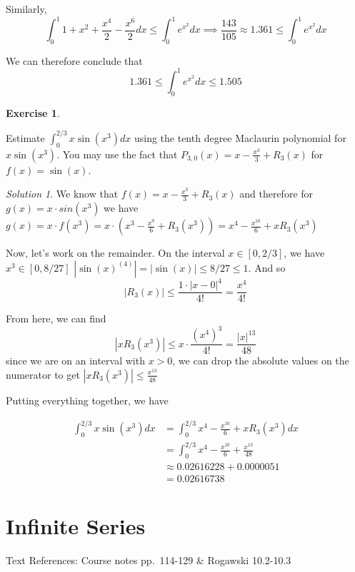 \documentclass[
]{book}
\theoremstyle{definition}
\theoremstyle{definition}
\theoremstyle{definition}
\newtheorem{exercise}{Exercise}[chapter]
\theoremstyle{definition}
\theoremstyle{remark}
\newtheorem*{solution}{Solution}
\begin{document}
Similarly, \[\int_0^1 1+x^2+\frac{x^4}{2}-\frac{x^6}{2}dx \leq \int_0^1 e^{x^2}dx \implies \frac{143}{105}\approx 1.361 \leq \int_0^1 e^{x^2}dx\]

We can therefore conclude that \[1.361 \leq \int_0^1 e^{x^2}dx \leq 1.505\]

\begin{exercise}
\protect\hypertarget{exr:unlabeled-div-168}{}\label{exr:unlabeled-div-168}

Estimate \(\displaystyle \int_0^{2/3}x\sin(x^3)dx\) using the tenth degree Maclaurin polynomial for \(x\sin(x^3)\). You may use the fact that \(P_{3,0}(x)=x-\frac{x^3}{3}+R_3(x)\) for \(f(x)=\sin(x)\).

\end{exercise}

\begin{solution}

We know that \(f(x)=x-\frac{x^3}{3}+R_3(x)\) and therefore for \(g(x)=x\cdot sin(x^3)\) we have \(g(x)=x\cdot f(x^3)=x\cdot \left (x^3-\frac{x^9}{6}+R_3(x^3)\right) = x^4-\frac{x^{10}}{6}+xR_3(x^3)\)

Now, let's work on the remainder. On the interval \(x\in [0, 2/3]\), we have \(x^3 \in [0, 8/27]\) \(|\sin(x)^{(4)}|=|\sin(x)|\leq 8/27\leq 1\). And so \[|R_3(x)|\leq \frac{1\cdot |x-0|^4}{4!}=\frac{x^4}{4!}\]

From here, we can find \[|xR_3(x^3)| \leq x\cdot \frac{(x^4)^3}{4!} = \frac{|x|^{13}}{48}\] since we are on an interval with \(x >0\), we can drop the absolute values on the numerator to get \(\displaystyle |xR_3(x^3)| \leq \frac{x^{13}}{48}\)

Putting everything together, we have

\begin{align*}
\int_0^{2/3}x\sin(x^3)dx &= \int_0^{2/3} x^4-\frac{x^{10}}{6}+xR_3(x^3) dx \\
&= \int_0^{2/3} x^4-\frac{x^{10}}{6}+\frac{x^{13}}{48}\\
& \approx 0.02616228 + 0.0000051\\
&= 0.02616738
\end{align*}

\end{solution}

\hypertarget{lec-25}{%
\chapter{Infinite Series}\label{lec-25}}

Text References: Course notes pp.~114-129 \& Rogawski 10.2-10.3
\end{document}

